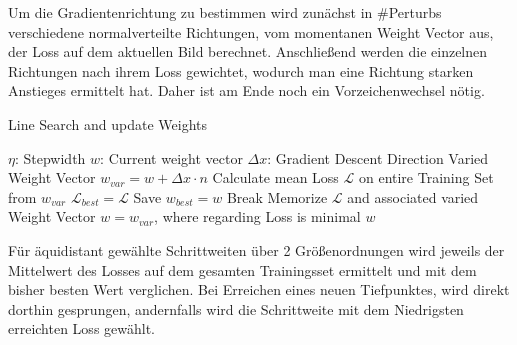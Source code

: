 Um die Gradientenrichtung zu bestimmen wird zunächst in \#Perturbs verschiedene normalverteilte Richtungen, vom momentanen Weight Vector aus, der Loss auf dem aktuellen Bild berechnet. Anschließend werden die einzelnen Richtungen nach ihrem Loss gewichtet, wodurch man eine Richtung starken Anstieges ermittelt hat. Daher ist am Ende noch ein Vorzeichenwechsel nötig.

\vspace{1cm}


\begin{algorithm}[H]
\caption{Line Search and update Weights}\label{alg:sgd_ls}
\begin{algorithmic}[1]
	\State $\eta$: Stepwidth
	\State $w$: Current weight vector
	\State $\Delta x$: Gradient Descent Direction
	\State
		\State Varied Weight Vector $w_{var} = w + \Delta x \cdot n$
		\State Calculate mean Loss $\mathcal{L}$ on entire Training Set
		\State from $w_{var}$
			\State $\mathcal{L}_{best} = \mathcal{L}$
			\State Save $w_{best} = w$
			\State Break
		\EndIf
		\State Memorize $\mathcal{L}$ and associated varied Weight Vector
	\EndFor
	\State $w = w_{var}$, where regarding Loss is minimal
	\State \Return $w$
\EndProcedure
\end{algorithmic}
\end{algorithm}

\vspace{0.5cm}

Für äquidistant gewählte Schrittweiten über 2 Größenordnungen wird jeweils der Mittelwert des Losses auf dem gesamten Trainingsset ermittelt und mit dem bisher besten Wert verglichen. Bei Erreichen eines neuen Tiefpunktes, wird direkt dorthin gesprungen, andernfalls wird die Schrittweite mit dem Niedrigsten erreichten Loss gewählt.







